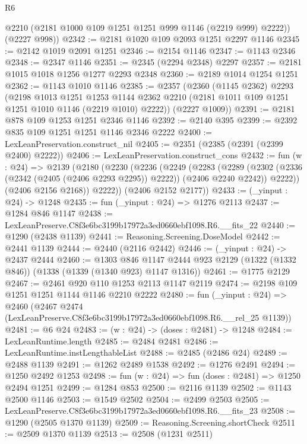 \begin{lexlean}{R6}
\begin{coremodule}
        @2210
        (@2181 @1000 @109 @1251 @1251 @999 @1146 (@2219 @999) @2222))
      (@2227 @998))
@2342 := @2181 @1020 @109 @2093 @1251 @2297 @1146
@2345 := @2142 @1019 @2091 @1251
@2346 := @2154 @1146
@2347 := @1143 @2346
@2348 := @2347 @1146
@2351 := @2345 (@2294 @2348) @2297
@2357 := @2181 @1015 @1018 @1256 @1277 @2293 @2348
@2360 := @2189 @1014 @1254 @1251
@2362 := @1143 @1010 @1146
@2385 := @2357
    (@2360
      (@1145 @2362)
      @2293
      (@2198
        @1013
        @1251
        @1253
        @1144
        @2362
        @2210
        (@2181 @1011 @109 @1251 @1251 @1010 @1146 (@2219 @1010) @2222))
      (@2227 @1009))
@2391 := @2181 @878 @109 @1253 @1251 @2346 @1146
@2392 := @2140 @395
@2399 := @2392 @835 @109 @1251 @1251 @1146 @2346 @2222
@2400 := LexLeanPreservation.construct_nil
@2405 := @2351 (@2385 (@2391 (@2399 @2400) @2222))
@2406 := LexLeanPreservation.construct_cons
@2432 := fun (w : @24) =>
  @2139
    (@2180
      (@2230
        (@2236
          (@2249
            (@2283
              (@2289
                (@2302 (@2336 (@2342 (@2405 (@2406 @2293 @2295)) @2222)) (@2406 @2240 @2242))
                @2222))
            (@2406 @2156 @2168))
          @2222))
      (@2406 @2152 @2177))
@2433 := (_yinput : @24) -> @1248
@2435 := fun (_yinput : @24) => @1276 @2113
@2437 := @1284 @846 @1147
@2438 := LexLeanPreserve.C8f3e6bc3199b17972a3ed0660ebf1098.R6.__fits_22
@2440 := @1290 (@2438 @1139)
@2441 := Reasoning.Screening.DoseModel
@2442 := @2441 @1139
@2444 := @2440 (@2116 @2442)
@2446 := (_yinput : @24) -> @2437 @2444
@2460 := @1303
    @846
    @1147
    @2444
    @923
    @2129
    (@1322 (@1332 @846))
    (@1338 (@1339 (@1340 @923) @1147 @1316))
@2461 := @1775 @2129
@2467 := @2461 @920 @110 @1253 @2113 @1147 @2119
@2474 := @2198 @109 @1251 @1251 @1144 @1146 @2210 @2222
@2480 := fun (_yinput : @24) =>
  @2460 (@2467 @2474 (LexLeanPreserve.C8f3e6bc3199b17972a3ed0660ebf1098.R6.__rel_25 @1139))
@2481 := @6 @24
@2483 := (w : @24) -> (doses : @2481) -> @1248
@2484 := LexLeanRuntime.length
@2485 := @2484 @2481
@2486 := LexLeanRuntime.instLengthableList
@2488 := @2485 (@2486 @24)
@2489 := @2488 @1139
@2491 := @1262 @2489 @1538
@2492 := @1276 @2491
@2494 := @1250 @2492 @1253
@2498 := fun (w : @24) => fun (doses : @2481) => @1250 @2494 @1251
@2499 := @1284 @853
@2500 := @2116 @1139
@2502 := @1143 @2500 @1146
@2503 := @1549 @2502
@2504 := @2499 @2503
@2505 := LexLeanPreserve.C8f3e6bc3199b17972a3ed0660ebf1098.R6.__fits_23
@2508 := @1290 (@2505 @1370 @1139)
@2509 := Reasoning.Screening.shortCheck
@2511 := @2509 @1370 @1139
@2513 := @2508 (@1231 @2511)

\end{coremodule}
\end{lexlean}
